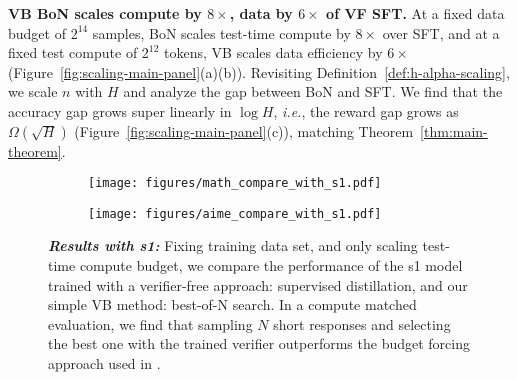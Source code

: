 \textbf{VB BoN scales compute by $8\times$, data by $6\times$ of VF SFT.} At a fixed data budget of $2^{14}$ samples, BoN scales test-time compute by $8\times$ over SFT, and at a fixed test compute of $2^{12}$ tokens, VB scales data efficiency by $6\times$ (Figure~\ref{fig:scaling-main-panel}(a)(b)). Revisiting Definition~\ref{def:h-alpha-scaling}, we scale $n$ with $H$ and analyze the gap between BoN and SFT. We find that the accuracy gap grows super linearly in $\log H$, \textit{i.e.}, the reward gap grows as $\Omega(\sqrt{H})$ (Figure~\ref{fig:scaling-main-panel}(c)), matching Theorem~\ref{thm:main-theorem}. 


\begin{figure}[!th]
    \centering
    \begin{subfigure}{0.35\linewidth}
        \centering
        \texttt{[image: figures/math\_compare\_with\_s1.pdf]}
    \end{subfigure}
    \begin{subfigure}{0.35\linewidth}
        \centering
        \texttt{[image: figures/aime\_compare\_with\_s1.pdf]}
    \end{subfigure}
    \vspace{-0.1cm}
    \caption{\footnotesize{\textbf{\emph{Results with s1:}} Fixing training data set, and only scaling test-time compute budget, we compare the performance of the  s1 model~\cite{muennighoff2025s1} trained with a verifier-free approach: supervised distillation, and our simple VB method: best-of-N search. In a compute matched evaluation, we find that sampling $N$ short responses and selecting the best one with the trained verifier outperforms the budget forcing approach used in \citet{muennighoff2025s1}.}
    \vspace{-0.2cm}
    }
    \label{fig:s1-results-panel}
\end{figure}

